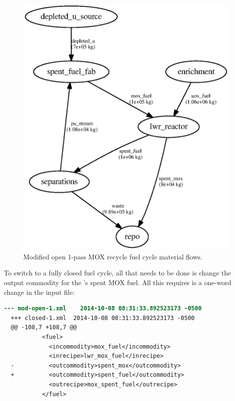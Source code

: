 \begin{figure}[H]
\label{fig:flowmodopen}
\caption{Modified open 1-pass \gls{MOX} recycle fuel cycle material flows.}
\begin{center}
\includegraphics{./images/flow-mod-open-1.eps}
\end{center}
\end{figure}

To switch to a fully closed fuel cycle, all that needs to be done is change
the output commodity for the 's spent \gls{MOX} fuel.  All this
requires is a one-word change in the input file: 

\begin{lstlisting}[language=diff]
  --- mod-open-1.xml	2014-10-08 08:31:33.892523173 -0500
  +++ closed-1.xml	2014-10-08 08:31:33.892523173 -0500
  @@ -108,7 +108,7 @@
           <fuel>         
             <incommodity>mox_fuel</incommodity>
             <inrecipe>lwr_mox_fuel</inrecipe>
  -          <outcommodity>spent_mox</outcommodity>
  +          <outcommodity>spent_fuel</outcommodity>
             <outrecipe>mox_spent_fuel</outrecipe>
           </fuel>
\end{lstlisting}

